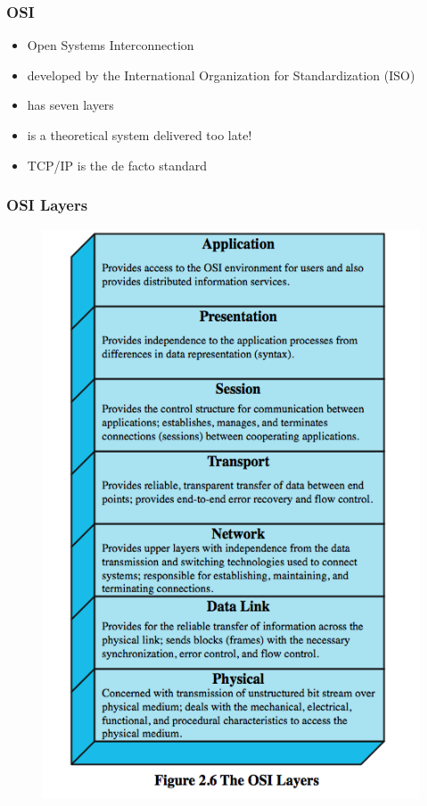 \documentclass[pdflatex,compress]{beamer}
\begin{document}
\begin{frame}
	\frametitle{OSI}
	\begin{itemize}
		\item Open Systems Interconnection
		\item developed by the International Organization for Standardization (ISO)
		\item has seven layers
		\item is a theoretical system delivered too late!
		\item TCP/IP is the de facto standard
	\end{itemize}
\end{frame}

\begin{frame}
	\frametitle{OSI Layers}
	\begin{figure}
		\centering
		\includegraphics[width=0.6\textheight]{img/img08}
	\end{figure}
\end{frame}
\end{document}
